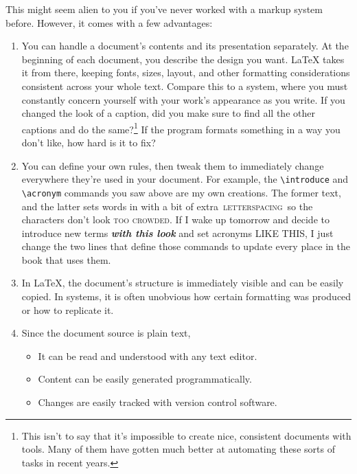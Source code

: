 This might seem alien to you if you've never worked with a markup system before.
However, it comes with a few advantages:
\begin{enumerate}
\item You can handle a document's contents and its presentation separately.
    At the beginning of each document,
    you describe the design you want.
    \LaTeX{} takes it from there,
    keeping fonts, sizes, layout,
    and other formatting considerations consistent across your
    whole text.
    Compare this to a  system,
    where you must constantly concern yourself with your work's appearance
    as you write.
    If you changed the look of a caption,
    did you make sure to find all the other captions and do the
    same?\footnote{This isn't to say that it's impossible
    to create nice, consistent documents with  tools.
    Many of them have gotten much better at automating these sorts of
    tasks in recent years.}
    If the program formats something in a way you don't like,
    how hard is it to fix?%

\item You can define your own rules, then tweak them to immediately change
    everywhere they're used in your document.
    For example, the \verb|\introduce| and \verb|\acronym| commands you saw above
    are my own creations. The former  text, and
    the latter sets words in  with a bit of extra
    \,\textsc{letterspacing}\, so the characters
    don't look \textsc{too crowded}.
    If I wake up tomorrow and decide to introduce new terms
    \textbf{\itshape with this look} and set acronyms
    {\small{} LIKE THIS},
    I just change the two lines that define those commands
    to update every place in the book that uses them.
\item In \LaTeX, the document's structure is immediately visible
    and can be easily copied.
    In  systems, it is often unobvious
    how certain formatting was produced
    or how to replicate it.
\item Since the document source is plain text,
    \begin{itemize}
    \item It can be read and understood with any text editor.
    \item Content can be easily generated programmatically.
    \item Changes are easily tracked with version control software.
    \end{itemize}
\end{enumerate}

